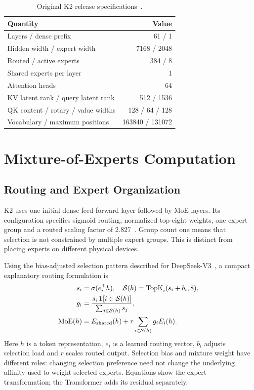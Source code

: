 \documentclass[conference]{IEEEtran}
\begin{document}
\begin{table}[t]
\caption{Original K2 release specifications~\cite{repo,config}.}
\centering\small
\begin{tabular}{lr}\toprule
Quantity & Value\\\midrule
Layers / dense prefix & 61 / 1\\
Hidden width / expert width & 7168 / 2048\\
Routed / active experts & 384 / 8\\
Shared experts per layer & 1\\
Attention heads & 64\\
KV latent rank / query latent rank & 512 / 1536\\
QK content / rotary / value widths & 128 / 64 / 128\\
Vocabulary / maximum positions & 163840 / 131072\\\bottomrule
\end{tabular}
\label{tab:spec}
\end{table}

\section{Mixture-of-Experts Computation}
\subsection{Routing and Expert Organization}
K2 uses one initial dense feed-forward layer followed by MoE layers. Its configuration specifies sigmoid routing, normalized top-eight weights, one expert group and a routed scaling factor of 2.827~\cite{config}. Group count one means that selection is not constrained by multiple expert groups. This is distinct from placing experts on different physical devices.

Using the bias-adjusted selection pattern described for DeepSeek-V3~\cite{v3}, a compact explanatory routing formulation is
\begin{align}
s_i &= \sigma(e_i^\top h),\quad
\mathcal{S}(h)=\operatorname{TopK}_i(s_i+b_i,8),\\
g_i &= \frac{s_i\,\mathbf{1}[i\in\mathcal{S}(h)]}
{\sum_{j\in\mathcal{S}(h)}s_j},\\
\operatorname{MoE}(h)&=E_{\rm shared}(h)+r\sum_{i\in\mathcal{S}(h)}g_iE_i(h).
\end{align}
Here $h$ is a token representation, $e_i$ is a learned routing vector, $b_i$ adjusts selection load and $r$ scales routed output. Selection bias and mixture weight have different roles: changing selection preference need not change the underlying affinity used to weight selected experts. Equations show the expert transformation; the Transformer adds its residual separately.
\end{document}

